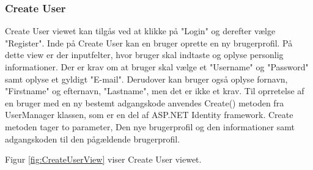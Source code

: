 \subsubsection{Create User}

Create User viewet kan tilgås ved at klikke på "Login" og derefter vælge "Register". Inde på Create User kan en bruger oprette en ny brugerprofil. På dette view er der inputfelter, hvor bruger skal indtaste og oplyse personlig informationer. Der er krav om at bruger skal vælge et "Username" og "Password" samt oplyse et gyldigt "E-mail". Derudover kan bruger også oplyse fornavn, "Firstname" og efternavn, "Lastname", men det er ikke et krav. 
Til oprretelse af en bruger med en ny bestemt adgangskode anvendes Create() metoden fra UserManager klassen, som er en del af ASP.NET Identity framework. Create metoden tager to parameter, Den nye brugerprofil og den informationer samt adgangskoden til den pågældende brugerprofil. 

Figur \ref{fig:CreateUserView} viser Create User viewet. 

